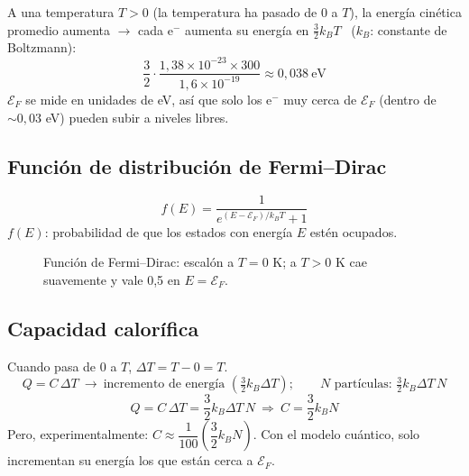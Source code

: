 \documentclass[11pt,a4paper]{article}
\newcommand{\Ep}{\mathcal{E}}
\begin{document}
A una temperatura $T>0$ (la temperatura ha pasado de 0 a $T$), la energía cinética promedio aumenta $\rightarrow$ cada e$^-$ aumenta
su energía en $\tfrac32k_BT$ \ ($k_B$: constante de Boltzmann):
\[
\frac32\cdot\frac{1{,}38\times10^{-23}\times300}{1{,}6\times10^{-19}}\approx0{,}038\ \text{eV}
\]
$\Ep_F$ se mide en unidades de eV, así que solo los e$^-$ muy cerca de $\Ep_F$ (dentro de $\sim0{,}03$ eV) pueden subir a niveles libres.

\subsection{Función de distribución de Fermi--Dirac}
\[
\boxed{f(E)=\frac{1}{e^{(E-\Ep_F)/k_BT}+1}}
\]
$f(E)$: probabilidad de que los estados con energía $E$ estén ocupados.

\begin{figure}[H]
\centering
{}
\caption{Función de Fermi--Dirac: escalón a $T=0$ K; a $T>0$ K cae suavemente y vale 0,5 en $E=\Ep_F$.}
\end{figure}

\subsection{Capacidad calorífica}
Cuando pasa de 0 a $T$, $\Delta T=T-0=T$.
\[
Q=C\,\Delta T\ \rightarrow\ \text{incremento de energía }\left(\tfrac32k_B\Delta T\right);\qquad N\text{ partículas: }\tfrac32k_B\Delta T\,N
\]
\[
Q=C\,\Delta T=\frac32k_B\Delta T\,N\ \Rightarrow\ C=\frac32k_BN
\]
Pero, experimentalmente: $C\approx\dfrac{1}{100}\left(\dfrac32k_BN\right)$. Con el modelo cuántico, solo incrementan su energía los
que están cerca a $\Ep_F$.
\end{document}
